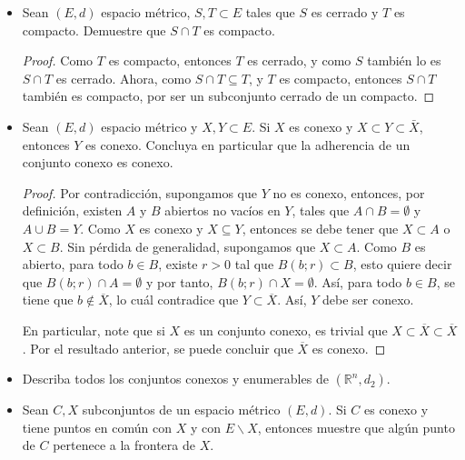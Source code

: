 \begin{itemize}[leftmargin=*]
    \item Sean $(E, d)$ espacio métrico, $S, T \subset E$ tales que $S$ es cerrado y $T$ es compacto. Demuestre que $S \cap T$ es compacto.\\
    \begin{proof}
        Como $T$ es compacto, entonces $T$ es cerrado, y como $S$ también lo es $S\cap T$ es cerrado. Ahora, como $S\cap T \subseteq T$, y $T$ es compacto, entonces $S \cap T$ también es compacto, por ser un subconjunto cerrado de un compacto. 
    \end{proof}
    
    \item Sean $(E, d)$ espacio métrico y $X, Y \subset E$. Si $X$ es conexo y $X \subset Y \subset \bar{X}$, entonces $Y$ es conexo. Concluya en particular que la adherencia de un conjunto conexo es conexo.\\
    \begin{proof}
        Por contradicción, supongamos que $Y$ no es conexo, entonces, por definición, existen $A$ y $B$ abiertos no vacíos en $Y$, tales que $A\cap B=\emptyset$ y $A \cup B=Y$. Como $X$ es conexo y $X \subseteq Y$, entonces se debe tener que $X \subset A$ o $X \subset B$. Sin pérdida de generalidad, supongamos que $X \subset A$. Como $B$ es abierto, para todo $b \in B$, existe $r>0$ tal que $B(b;r) \subset B$, esto quiere decir que $B(b;r)\cap A=\emptyset$ y por tanto, $B(b;r)\cap X=\emptyset$. Así, para todo $b \in B$, se tiene que $b \notin \overline{X}$, lo cuál contradice que $Y \subset \overline{X}$. Así, $Y$ debe ser conexo. 

        En particular, note que si $X$ es un conjunto conexo, es trivial que $X \subset \overline{X} \subset \overline{X}$. Por el resultado anterior, se puede concluir que $\overline{X}$ es conexo.
    \end{proof}

    \item Describa todos los conjuntos conexos y enumerables de $\left(\mathbb{R}^n, d_2\right)$.
    
    \item Sean $C, X$ subconjuntos de un espacio métrico $(E, d)$. Si $C$ es conexo y tiene puntos en común con $X$ y con $E \backslash X$, entonces muestre que algún punto de $C$ pertenece a la frontera de $X$.
\end{itemize}




